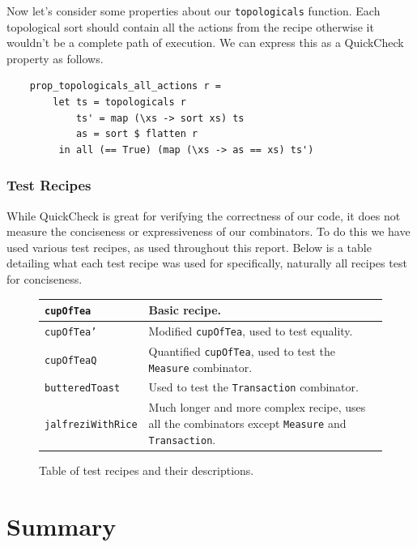 \documentclass[11pt]{article}
\begin{document}
\medbreak

Now let's consider some properties about our \texttt{topologicals} function. Each
topological sort should contain all the actions from the recipe otherwise it wouldn't
be a complete path of execution. We can express this as a QuickCheck property as follows.

\begin{lstlisting}
    prop_topologicals_all_actions r =
        let ts = topologicals r
            ts' = map (\xs -> sort xs) ts
            as = sort $ flatten r
         in all (== True) (map (\xs -> as == xs) ts')
\end{lstlisting}

\subsubsection{Test Recipes}

While QuickCheck is great for verifying the correctness of our code, it does
not measure the conciseness or expressiveness of our combinators. To do this
we have used various test recipes, as used throughout this report. Below
is a table detailing what each test recipe was used for specifically,
naturally all recipes test for conciseness.

\begin{figure}[h]
\begin{tabular}{ |p{35mm}|p{\textwidth - 40mm}| }
    \hline
    \texttt{cupOfTea} & Basic recipe. \\
    \hline
    \texttt{cupOfTea'} & Modified \texttt{cupOfTea}, used to test equality. \\
    \hline
    \texttt{cupOfTeaQ} & Quantified \texttt{cupOfTea}, used to test the \texttt{Measure} combinator. \\
    \hline
    \texttt{butteredToast} & Used to test the \texttt{Transaction} combinator. \\
    \hline
    \texttt{jalfreziWithRice} & Much longer and more complex recipe, uses
        all the combinators except \texttt{Measure} and \texttt{Transaction}. \\
    \hline
\end{tabular}
\caption{Table of test recipes and their descriptions.}
\end{figure}

\section{Summary}
\end{document}
